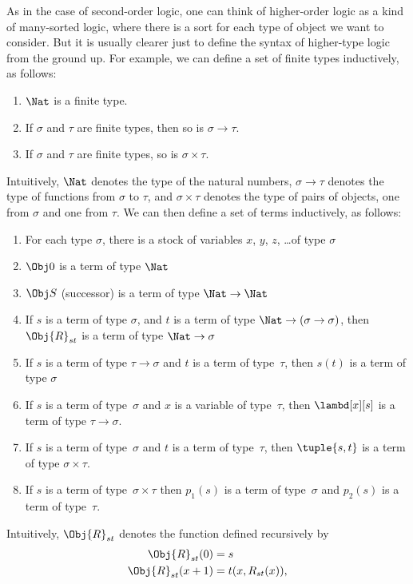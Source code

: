 \documentclass[../../../include/open-logic-section]{subfiles}
\begin{document}
As in the case of second-order logic, one can think of higher-order
logic as a kind of many-sorted logic, where there is a sort for each
type of object we want to consider. But it is usually clearer just to
define the syntax of higher-type logic from the ground up. For
example, we can define a set of finite types inductively, as follows:
\begin{enumerate}
\item $\Nat$ is a finite type.
\item If $\sigma$ and $\tau$ are finite types, then so is $\sigma
  \to \tau$.
\item If $\sigma$ and $\tau$ are finite types, so is $\sigma \times
  \tau$.
\end{enumerate}
Intuitively, $\Nat$ denotes the type of the natural numbers,
$\sigma \to \tau$ denotes the type of functions from $\sigma$ to
$\tau$, and $\sigma \times \tau$ denotes the type of pairs of objects,
one from $\sigma$ and one from $\tau$. We can then define a set of
terms inductively, as follows:
\begin{enumerate}
\item For each type $\sigma$, there is a stock of variables $x$, $y$,
  $z$, \dots of type $\sigma$
\item $\Obj 0$ is a term of type $\Nat$
\item $\Obj S$ (successor) is a term of type $\Nat \to \Nat$
\item If $s$ is a term of type $\sigma$, and $t$ is a term of type
  $\Nat \to (\sigma \to \sigma)$, then $\Obj{R}_{st}$ is a term of type
  $\Nat \to \sigma$
\item If $s$ is a term of type $\tau \to \sigma$ and $t$ is a
  term of type~$\tau$, then $s(t)$ is a term of type $\sigma$
\item If $s$ is a term of type~$\sigma$ and $x$ is a variable of
  type~$\tau$, then $\lambd[x][s]$ is a term of type $\tau \to \sigma$.
\item If $s$ is a term of type~$\sigma$ and $t$ is a term of
  type~$\tau$, then $\tuple{s, t}$ is a term of type $\sigma \times
  \tau$.
\item If $s$ is a term of type~$\sigma \times \tau$ then $p_1(s)$ is a
  term of type~$\sigma$ and $p_2(s)$ is a term of type~$\tau$.
\end{enumerate}
Intuitively, $\Obj{R}_{st}$ denotes the function defined recursively by
\begin{align*}
\Obj{R}_{st}(0) & = s \\
\Obj{R}_{st}(x+1) & = t(x, R_{st}(x)),
\end{align*}
\end{document}
